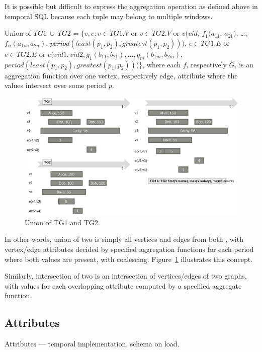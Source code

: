 It is possible but difficult to express the aggregation operation as
defined above in temporal SQL because each tuple may belong to
multiple windows.

\begin{definition}[Union]
Union of $TG1\ \cup\ TG2$ = $\{v, e: v \in TG1.V$ or $v \in TG2.V$ or
$v(vid$, $f_1(a_{11}$, $a_{21})$, \ldots, $f_n(a_{1n}, a_{2n})$,
$period(least(p_1, p_2), greatest(p_1, p_2)))$, $e \in TG1.E$ or $e
\in TG2.E$ or $e(vid1, vid2, g_1(b_{11}, b_{21}), \ldots, g_m(b_{1m},
b_{2m})$, $period(least(p_1, p_2), greatest(p_1, p_2))) \}$, where
each $f$, respectively $G$, is an aggregation function over one
vertex, respectively edge, attribute where the values intersect over
some period $p$.
\label{def:union}
\end{definition}

\begin{figure}
\includegraphics[width=6.5in]{figs/union.pdf}
\caption{Union of TG1 and TG2.}
\label{fig:union}
\end{figure}

In other words, union of two \tgs is simply all vertices and edges
from both \tgs, with vertex/edge attributes decided by specified
aggregation functions for each period where both values are present,
with coalescing.  Figure~\ref{fig:union} illustrates this concept.

Similarly, intersection of two \tgs is an intersection of
vertices/edges of two graphs, with values for each overlapping
attribute computed by a specified aggregate function.

\subsection{Attributes}

Attributes --- temporal implementation, schema on load.

